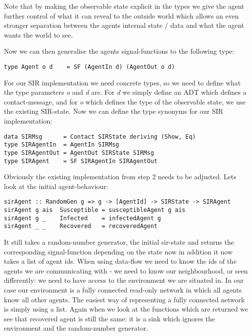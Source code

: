 Note that by making the observable state explicit in the types we give the agent further control of what it can reveal to the outside world which allows an even stronger separation between the agents internal state / data and what the agent wants the world to see.

Now we can then generalise the agents signal-functions to the following type:
\begin{verbatim}
type Agent o d    = SF (AgentIn d) (AgentOut o d)
\end{verbatim}

For our SIR implementation we need concrete types, so we need to define what the type parameters \textit{o} and \textit{d} are. For \textit{d} we simply define an ADT which defines a contact-message, and for \textit{o} which defines the type of the observable state, we use the existing SIR-state. Now we can define the type synonyms for our SIR implementation:
\begin{verbatim}
data SIRMsg      = Contact SIRState deriving (Show, Eq)
type SIRAgentIn  = AgentIn SIRMsg
type SIRAgentOut = AgentOut SIRState SIRMsg
type SIRAgent    = SF SIRAgentIn SIRAgentOut
\end{verbatim}

Obviously the existing implementation from step 2 needs to be adjusted. Lets look at the initial agent-behaviour:

\begin{verbatim}
sirAgent :: RandomGen g => g -> [AgentId] -> SIRState -> SIRAgent
sirAgent g ais  Susceptible = susceptibleAgent g ais
sirAgent g _    Infected    = infectedAgent g
sirAgent _ _    Recovered   = recoveredAgent
\end{verbatim}

It still takes a random-number generator, the initial sir-state and returns the corresponding signal-function depending on the state now in addition it now takes a list of agent ids. When using data-flow we need to know the ids of the agents we are communicating with - we need to know our neighbourhood, or seen differently: we need to have access to the environment we are situated in. In our case our environment is a fully connected read-only network in which all agents know all other agents. The easiest way of representing a fully connected network is simply using a list.
Again when we look at the functions which are returned we see that recovered agent is still the same: it is a sink which ignores the environment and the random-number generator. 

